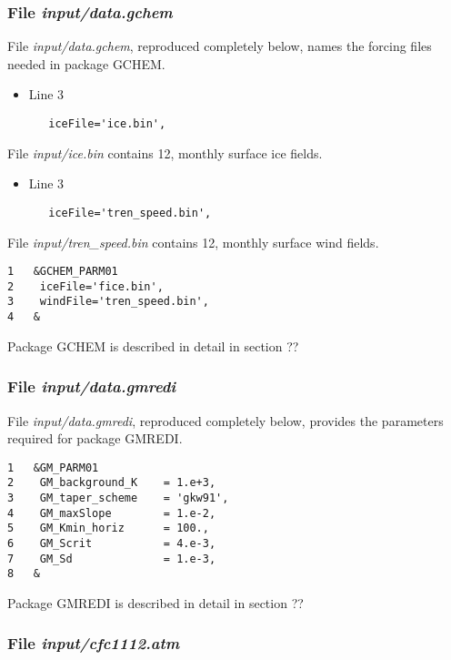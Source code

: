 \subsubsection{File {\it input/data.gchem}}
\label{www:tutorials}

\noindent File {\it input/data.gchem}, reproduced completely below,
names the forcing files needed in package GCHEM.

\begin{itemize}
\item Line 3
\begin {verbatim}
   iceFile='ice.bin',
\end{verbatim}
\end{itemize}

\noindent File {\it input/ice.bin} contains 12, monthly surface ice
fields.

\begin{itemize}
\item Line 3
\begin {verbatim}
   iceFile='tren_speed.bin',
\end{verbatim}
\end{itemize}

\noindent File {\it input/tren\_speed.bin} contains 12, monthly
surface wind fields.

\begin {verbatim}
1   &GCHEM_PARM01
2    iceFile='fice.bin',
3    windFile='tren_speed.bin',
4   &
\end{verbatim}

\noindent Package GCHEM is described in detail in section ??

\subsubsection{File {\it input/data.gmredi}}
\label{www:tutorials}

\noindent File {\it input/data.gmredi}, reproduced completely below,
provides the parameters required for package GMREDI.

\begin {verbatim}
1   &GM_PARM01
2    GM_background_K    = 1.e+3,
3    GM_taper_scheme    = 'gkw91',
4    GM_maxSlope        = 1.e-2,
5    GM_Kmin_horiz      = 100.,
6    GM_Scrit           = 4.e-3,
7    GM_Sd              = 1.e-3,
8   &
\end{verbatim}

\noindent Package GMREDI is described in detail in section ??

\subsubsection{File {\it input/cfc1112.atm}}
\label{www:tutorials}

